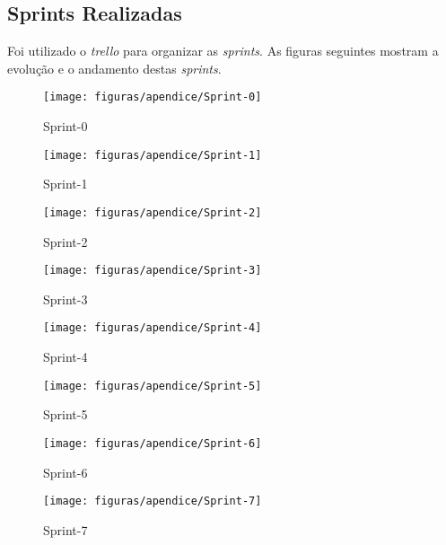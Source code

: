 \begin{apendicesenv}

\partapendices

\chapter{Sprints Realizadas}
\label{app:apendice_um}
Foi utilizado o \textit{trello} para organizar as \textit{sprints}. As figuras seguintes mostram a evolução e o andamento destas \textit{sprints}.

\begin{figure}[!h]
	\centering
	\texttt{[image: figuras/apendice/Sprint-0]}
	\caption{Sprint-0}
	\label{fig:sprint_0}
\end{figure}

\begin{figure}[!h]
	\centering
	\texttt{[image: figuras/apendice/Sprint-1]}
	\caption{Sprint-1}
	\label{fig:sprint_1}
\end{figure}

\begin{figure}[!h]
	\centering
	\texttt{[image: figuras/apendice/Sprint-2]}
	\caption{Sprint-2}
	\label{fig:sprint_2}
\end{figure}

\begin{figure}[!h]
	\centering
	\texttt{[image: figuras/apendice/Sprint-3]}
	\caption{Sprint-3}
	\label{fig:sprint_3}
\end{figure}

\begin{figure}[!h]
	\centering
	\texttt{[image: figuras/apendice/Sprint-4]}
	\caption{Sprint-4}
	\label{fig:sprint_4}
\end{figure}

\begin{figure}[!h]
	\centering
	\texttt{[image: figuras/apendice/Sprint-5]}
	\caption{Sprint-5}
	\label{fig:sprint_5}
\end{figure}

\begin{figure}[!h]
	\centering
	\texttt{[image: figuras/apendice/Sprint-6]}
	\caption{Sprint-6}
	\label{fig:sprint_6}
\end{figure}

\begin{figure}[!h]
	\centering
	\texttt{[image: figuras/apendice/Sprint-7]}
	\caption{Sprint-7}
	\label{fig:sprint_7}
\end{figure}


\end{apendicesenv}
